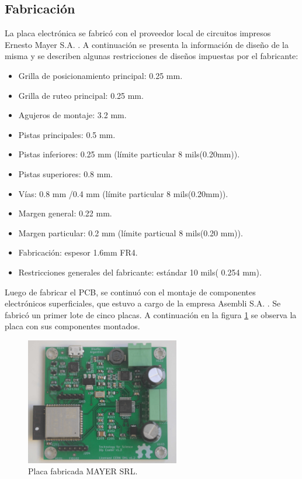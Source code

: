   
\subsection{Fabricación}
La placa electrónica se fabricó con el proveedor local de circuitos impresos Ernesto Mayer S.A. \citep{web_mayer}. A continuación se presenta la información de diseño de la misma y se describen algunas  restricciones de diseños impuestas por el fabricante:

\begin{itemize}

\item Grilla de posicionamiento principal: 0.25 mm.
\item Grilla de ruteo principal: 0.25 mm.
\item Agujeros de montaje: 3.2 mm.
\item Pistas principales: 0.5 mm.
\item Pistas inferiores: 0.25 mm (límite particular 8 mils(0.20mm)).
\item Pistas superiores: 0.8 mm.
\item Vías: 0.8 mm /0.4 mm (límite particular 8 mils(0.20mm)).
\item Margen general: 0.22 mm.
\item Margen particular: 0.2 mm (límite particual 8 mils(0.20 mm)).
\item Fabricación: espesor 1.6mm FR4.  
\item Restricciones generales del fabricante: estándar 10 mils( 0.254 mm).

\end{itemize}

Luego de fabricar el PCB, se continuó con el montaje de componentes electrónicos superficiales, que estuvo a cargo de la empresa Asembli S.A. \citep{web_asembli}. Se fabricó un primer lote de cinco placas. A continuación en la figura \ref{fig:dip_real_model} se observa la placa con sus componentes montados.


\begin{figure}[htbp]
	\centering
	\includegraphics[width=0.6\textwidth]{./Figures/dip_real_model.jpg}
	\caption{Placa fabricada MAYER SRL.}
	\label{fig:dip_real_model}
\end{figure}

